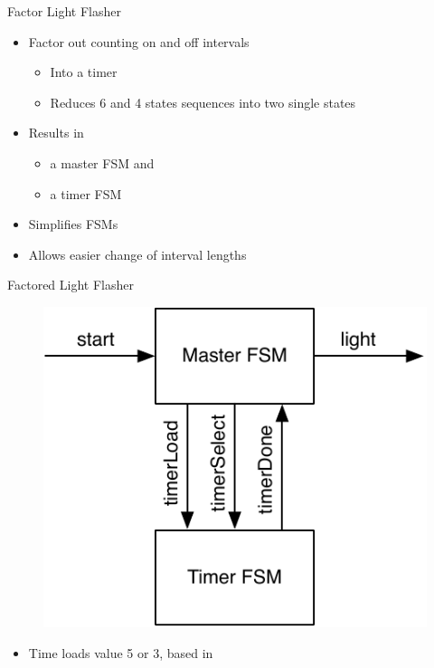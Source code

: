 \begin{frame}[fragile]{Factor Light Flasher}
\begin{itemize}
\item Factor out counting on and off intervals
\begin{itemize}
\item Into a timer
\item Reduces 6 and 4 states sequences into two single states
\end{itemize}
\item Results in
\begin{itemize}
\item a master FSM and
\item a timer FSM
\end{itemize}
\item Simplifies FSMs
\item Allows easier change of interval lengths
\end{itemize}
\end{frame}



\begin{frame}[fragile]{Factored Light Flasher}
\begin{figure}
  \includegraphics[scale=\scale]{../figures/flasher}
\end{figure}
\begin{itemize}
\item Time loads value 5 or 3, based in 
\end{itemize}
\end{frame}

